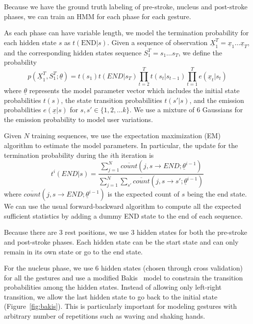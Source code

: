 \documentclass{sig-alternate-2013}
\begin{document}
Because we have the ground truth labeling of pre-stroke, nucleus and post-stroke phases, 
we can train an HMM for each phase for each gesture. 

As each phase can have variable length, we model the termination probability for each
hidden state $s$ as $t(\text{END}|s)$. Given a sequence of observation $\underline{X}_1^T = \underline{x}_1\ldots\underline{x}_T$, and 
the corresponding hidden states sequence $S_1^T = s_1\ldots s_T$, we define the probability
\begin{displaymath}
p(\underline{X}_1^T, S_1^T;\underline{\theta}) = 
    t(s_1)t(END|s_T)\prod_{t = 2}^T t(s_t | s_{t-1})\prod_{t = 1}^T e(\underline{x}_t|s_t)
\end{displaymath}
where $\underline{\theta}$ represents the model parameter vector which includes
the initial state probabilities $t(s)$, the state transition probabilities $t(s'|s)$, and the 
emission probabilities $e(\underline{x}|s)$ for $s, s'\in \{1, 2,\ldots k\}$. 
We use a mixture of 6 Gaussians for the emission probability to model user variations.

Given $N$ training sequences, we use the expectation maximization (EM) algorithm to estimate the model parameters. In
particular, the update for the termination probability during the $i$th iteration is 
\begin{displaymath}
t^i(END|s) = \frac{\sum_{j = 1}^N \overline{count}(j, s\rightarrow END;\underline{\theta}^{i-1})}
    {\sum_{j = 1}^N\sum_{s'} \overline{count}(j, s\rightarrow s';\underline{\theta}^{i-1})}
\end{displaymath}
where $\overline{count}(j, s\rightarrow END;\underline{\theta}^{i-1})$ is the expected count of 
$s$ being the end state. We can use the usual forward-backward algorithm to compute all the 
expected sufficient statistics by adding a dummy END state to the end of each sequence.

Because there are 3 rest positions, we use 3 hidden states for both the pre-stroke and post-stroke phases.
Each hidden state can be the start state and can only remain in its own state or go to the end state.
 
For the nucleus phase, we use 6 hidden states (chosen through cross validation) for all the gestures and use a modified Bakis~\cite{bauer2000} model to constrain the transition probabilities
among the hidden states. Instead of allowing only left-right transition, we allow the last hidden state
to go back to the initial state (Figure~\ref{fig:bakis}). This is particularly important for modeling gestures with arbitrary number of
repetitions such as waving and shaking hands. 
\end{document}
